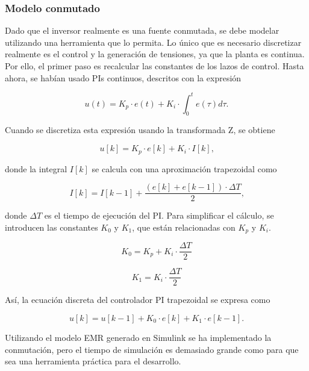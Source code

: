 \subsubsection{Modelo conmutado}

Dado que el inversor realmente es una fuente conmutada, se debe modelar utilizando una herramienta que lo permita. Lo único que es necesario discretizar realmente es el control y la generación de tensiones, ya que la planta es continua. Por ello, el primer paso es recalcular las constantes de los lazos de control. Hasta ahora, se habían usado PIs continuos, descritos con la expresión

\begin{equation}
	u(t) = K_p \cdot e(t) + K_i \cdot \int_{0}^{t} e(\tau) d\tau \text{.}
\end{equation}

Cuando se discretiza esta expresión usando la transformada Z, se obtiene

\begin{equation}
	u[k] = K_p \cdot e[k] + K_i \cdot I[k] \text{,}
\end{equation}

donde la integral \( I[k] \) se calcula con una aproximación trapezoidal como

\begin{equation}
	I[k] = I[k-1] + \frac{(e[k] + e[k-1]) \cdot \Delta T}{2} \text{,}
\end{equation}

donde $\Delta T$ es el tiempo de ejecución del PI. Para simplificar el cálculo, se introducen las constantes \( K_0 \) y \( K_1 \), que están relacionadas con \( K_p \) y \( K_i \).

\begin{equation}
	K_0 = K_p + K_i \cdot \frac{\Delta T}{2}
\end{equation}

\begin{equation}
	K_1 = K_i \cdot \frac{\Delta T}{2}
\end{equation}

Así, la ecuación discreta del controlador PI trapezoidal se expresa como

\begin{equation}
	u[k] = u[k-1] + K_0 \cdot e[k] + K_1 \cdot e[k-1] \text{.}
\end{equation}



Utilizando el modelo EMR generado en Simulink se ha implementado la conmutación, pero el tiempo de simulación es demasiado grande como para que sea una herramienta práctica para el desarrollo.

